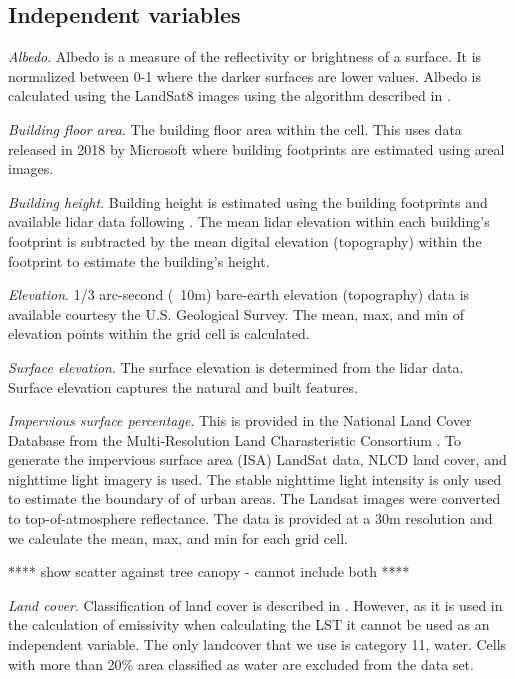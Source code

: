 \documentclass[final,3p,times,twocolumn,sort&compress]{elsarticle}
\begin{document}
\subsection{Independent variables}

\textit{Albedo}. Albedo is a measure of the reflectivity or brightness of a surface. It is normalized between 0-1 where the darker surfaces are lower values. Albedo is calculated using the LandSat8 images using the algorithm described in \cite{Smith2010-nw, Liang2001-jd}. 

\textit{Building floor area}. The building floor area within the cell. This uses data released in 2018 by Microsoft where building footprints are estimated using areal images. 

\textit{Building height}. Building height is estimated using the building footprints and available lidar data following \cite{Chun2017-mm}. The mean lidar elevation within each building's footprint is subtracted by the mean digital elevation (topography) within the footprint to estimate the building's height.

\textit{Elevation}. 1/3 arc-second (~10m) bare-earth elevation (topography) data is available courtesy the U.S. Geological Survey. The mean, max, and min of elevation points within the grid cell is calculated.

\textit{Surface elevation}. The surface elevation is determined from the lidar data. Surface elevation captures the natural and built features. 

\textit{Impervious surface percentage}. This is provided in the National Land Cover Database from the Multi-Resolution Land Charasteristic Consortium \cite{Xian2011-aa}. To generate the impervious surface area (ISA) LandSat data, NLCD land cover, and nighttime light imagery is used. The stable nighttime light intensity is only used to estimate the boundary of of urban areas. The Landsat images were converted to top-of-atmosphere reflectance. The data is provided at a 30m resolution and we calculate the mean, max, and min for each grid cell.

**** show scatter against tree canopy - cannot include both ****

\textit{Land cover}. Classification of land cover is described in \cite{Homer2015-ce}. However, as it is used in the calculation of emissivity when calculating the LST it cannot be used as an independent variable. The only landcover that we use is category 11, water. Cells with more than 20\% area classified as water are excluded from the data set.
\end{document}
